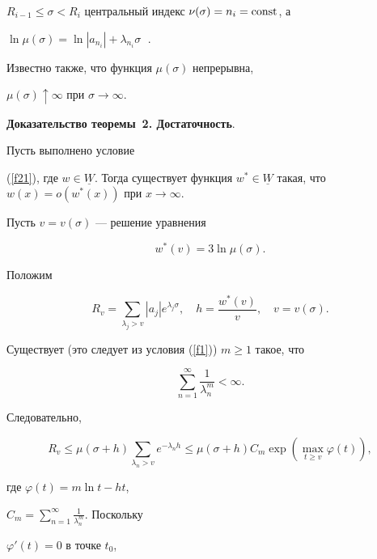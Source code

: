 $R_{i-1}\leq\sigma<R_{i}$ центральный индекс $\nu(\sigma)=n_{i}=\operatorname{const}$, а


$\ln\mu(\sigma)=\ln|a_{n_{i}}|+\lambda_{n_{i}}\sigma\;$ \cite{lit1}.


Известно также, что функция $\mu(\sigma)$ непрерывна,


$\mu(\sigma)\uparrow\infty$ при $\sigma\to\infty$.





{\bf Доказательство теоремы~2. Достаточность}.





Пусть выполнено условие


(\ref{f21}), где $w\in\underline{W}$. Тогда существует функция $w^{*}\in


\underline{W}$ такая, что $w(x)=o(w^{*}(x))$ при $x\to\infty$.





Пусть $v=v(\sigma)$ --- решение уравнения


\begin{equation}\label{f24}


w^{*}(v)=3\ln \mu(\sigma).


\end{equation}


Положим


$$


R_{v}=\sum_{\lambda_{j}>v} |a_{j}|e^{\lambda_{j}\sigma},\quad


h=\frac{w^{*}(v)}{v},\quad v=v(\sigma).


$$


Существует (это следует из условия (\ref{f1})) $m\geq 1$ такое, что


$$


\sum_{n=1}^{\infty}\frac{1}{\lambda_{n}^{m}}<\infty.


$$


Следовательно,


$$


R_{v}\leq\mu(\sigma+h)


\sum_{\lambda_{n}>v}e^{-\lambda_{n}h}\leq


\mu(\sigma+h) C_{m}\exp(\max_{t\geq v}\varphi(t)),


$$


где $\varphi(t)=m\ln t-ht$,


$C_{m}=\sum\limits_{n=1}^{\infty}\frac{1}{\lambda_{n}^{m}}$. Поскольку


$\varphi'(t)=0$ в точке $t_{0}$,


